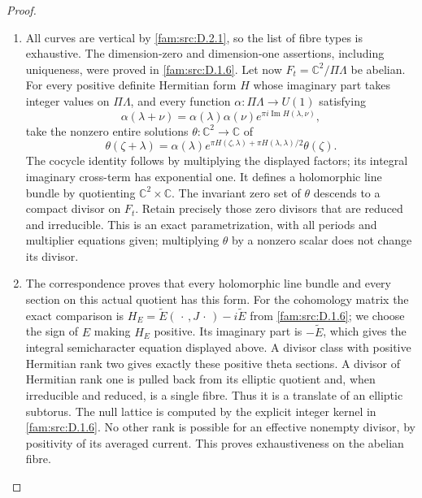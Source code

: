 \begin{proof}
\begin{enumerate}[label=\arabic*.,leftmargin=*]
\item \label{app:rederive:fam-src-D.2.3}
All curves are vertical by \ref{fam:src:D.2.1}, so the list of fibre types is exhaustive.
The dimension-zero and dimension-one assertions, including uniqueness,
were proved in \ref{fam:src:D.1.6}. Let now $F_t=\mathbb C^2/\Pi\Lambda$ be abelian.
For every positive definite Hermitian form $H$ whose imaginary part takes
integer values on $\Pi\Lambda$, and every function
$\alpha:\Pi\Lambda\to U(1)$ satisfying
\[
 \alpha(\lambda+\nu)=\alpha(\lambda)\alpha(\nu)
                 e^{\pi i\operatorname{Im}H(\lambda,\nu)},
\]
take the nonzero entire solutions $\theta:\mathbb C^2\to\mathbb C$ of
\begin{equation}\label{fam:eq:cd-theta-sections}
 \theta(\zeta+\lambda)=\alpha(\lambda)
 e^{\pi H(\zeta,\lambda)+\pi H(\lambda,\lambda)/2}\theta(\zeta).
\end{equation}
The cocycle identity follows by multiplying the displayed factors; its
integral imaginary cross-term has exponential one. It defines a
holomorphic line bundle by quotienting $\mathbb C^2\times\mathbb C$.
The invariant zero set of $\theta$ descends to a compact divisor on
$F_t$. Retain precisely those zero divisors that are reduced and
irreducible. This is an exact parametrization, with all periods and
multiplier equations given; multiplying $\theta$ by a nonzero scalar
does not change its divisor.

\item The correspondence \cite[Theorem 4.1, p.~1, and equation (4.3), p.~2]{Schnell19} proves
that every holomorphic line bundle and every section on this actual
quotient has this form. For the cohomology matrix the exact comparison is
$H_E=\widetilde E(\,\cdot\,,J\,\cdot\,)-i\widetilde E$ from \ref{fam:src:D.1.6};
we choose the sign of $E$ making $H_E$ positive. Its imaginary part is
$-\widetilde E$, which gives the integral semicharacter equation displayed
above. A divisor class with positive Hermitian rank two gives exactly
these positive theta sections. A divisor of Hermitian rank one is pulled
back from its elliptic quotient and, when irreducible and reduced, is a
single fibre. Thus it is a translate of an elliptic subtorus. The null
lattice is computed by the explicit integer kernel in \ref{fam:src:D.1.6}. No other
rank is possible for an effective nonempty divisor, by positivity of its
averaged current. This proves exhaustiveness on the abelian fibre.


\end{enumerate}
\end{proof}
